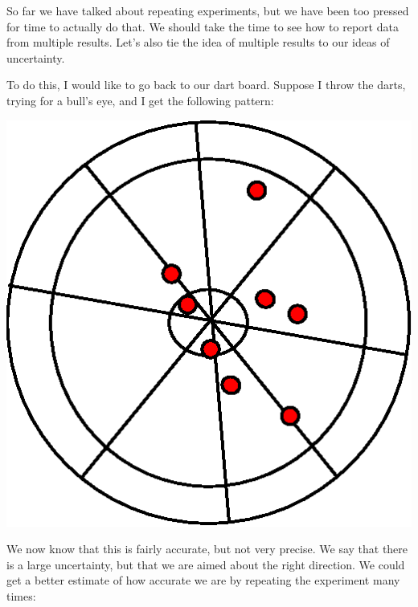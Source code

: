 \documentclass[twoside,11pt,ShortChapTitles]{BYUTextbook}
\begin{document}
So far we have talked about repeating experiments, but we have been too
pressed for time to actually do that. We should take the time to see how to
report data from multiple results. Let's also tie the idea of multiple
results to our ideas of uncertainty.

To do this, I would like to go back to our dart board. Suppose I throw the
darts, trying for a bull's eye, and I get the following pattern:

\begin{center}
\includegraphics[scale=0.5]{Lab2_figs/bullseye_few.eps}
\end{center}

We now know that this is fairly accurate, but not very precise. We say that
there is a large uncertainty, but that we are aimed about the right
direction. We could get a better estimate of how accurate we are by
repeating the experiment many times:
\end{document}
